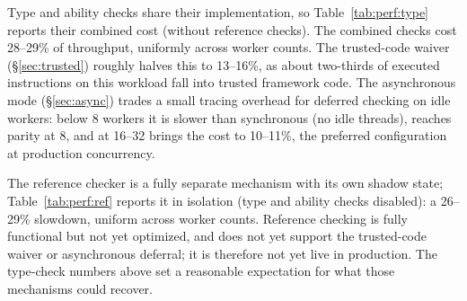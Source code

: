 Type and ability checks share their implementation, so Table~\ref{tab:perf:type} reports their combined cost (without reference checks).
The combined checks cost 28--29\% of throughput, uniformly across worker counts.
The trusted-code waiver (\S\ref{sec:trusted}) roughly halves this to 13--16\%, as about two-thirds of executed instructions on this workload fall into trusted framework code.
The asynchronous mode (\S\ref{sec:async}) trades a small tracing overhead for deferred checking on idle workers: below 8 workers it is slower than synchronous (no idle threads), reaches parity at 8, and at 16--32 brings the cost to 10--11\%, the preferred configuration at production concurrency.

The reference checker is a fully separate mechanism with its own shadow state; Table~\ref{tab:perf:ref} reports it in isolation (type and ability checks disabled): a 26--29\% slowdown, uniform across worker counts.
Reference checking is fully functional but not yet optimized, and does not yet support the trusted-code waiver or asynchronous deferral; it is therefore not yet live in production.
The type-check numbers above set a reasonable expectation for what those mechanisms could recover.

